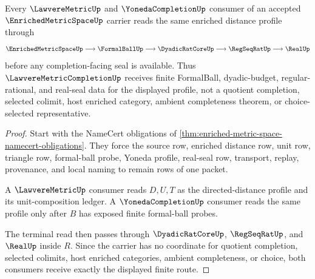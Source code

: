 \begin{theorem}
\label{thm:enriched-metric-space-lawvere-yoneda-route}
Every $\LawvereMetricUp$ and $\YonedaCompletionUp$ consumer of an accepted $\EnrichedMetricSpaceUp$ carrier reads the same enriched distance profile through
$$
\EnrichedMetricSpaceUp \longrightarrow \FormalBallUp \longrightarrow \DyadicRatCoreUp \longrightarrow \RegSeqRatUp \longrightarrow \RealUp
$$
before any completion-facing seal is available. Thus $\LawvereMetricCompletionUp$ receives finite FormalBall, dyadic-budget, regular-rational, and real-seal data for the displayed profile, not a quotient completion, selected colimit, host enriched category, ambient completeness theorem, or choice-selected representative.
\end{theorem}
\begin{proof}
Start with the NameCert obligations of \autoref{thm:enriched-metric-space-namecert-obligations}. They force the source row, enriched distance row, unit row, triangle row, formal-ball probe, Yoneda profile, real-seal row, transport, replay, provenance, and local naming to remain rows of one packet.

A $\LawvereMetricUp$ consumer reads $D,U,T$ as the directed-distance profile and its unit-composition ledger. A $\YonedaCompletionUp$ consumer reads the same profile only after $B$ has exposed finite formal-ball probes.

The terminal read then passes through $\DyadicRatCoreUp$, $\RegSeqRatUp$, and $\RealUp$ inside $R$. Since the carrier has no coordinate for quotient completion, selected colimits, host enriched categories, ambient completeness, or choice, both consumers receive exactly the displayed finite route.
\end{proof}



